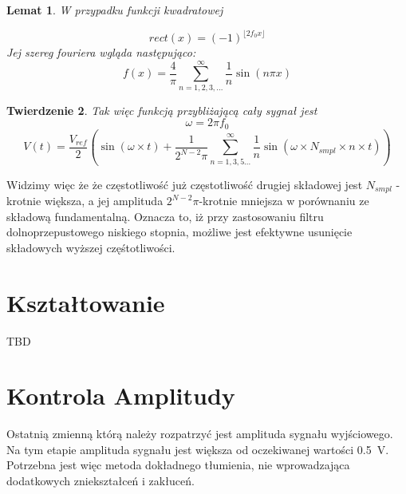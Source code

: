 \documentclass[12pt, a4paper]{article}
\newtheorem{theorem}{Twierdzenie}[section]
\newtheorem{lemma}[theorem]{Lemat}
\begin{document}
\begin{lemma}
	W przypadku funkcji kwadratowej
	
	\begin{equation}
		rect(x) = (-1)^{\lfloor	2 f_0 x \rfloor}
	\end{equation}
	Jej szereg fouriera wgląda następująco:
	\begin{equation}
			f(x) = \frac{4}{\pi} \sum_{n=1,2,3,...}^{\infty} \frac{1}{n} \sin \left( n \pi x \right)
	\end{equation}
\end{lemma}

\begin{theorem}
Tak więc funkcją przybliżającą cały sygnał jest
	\begin{equation}
		\omega = 2 \pi f_0 
	\end{equation}
	\begin{equation}
		V(t) = \frac{V_{ref}}{2} \left( \sin \left( \omega \times t \right) + \frac{1}{ 2^{N - 2}\pi} \sum_{n=1,3,5...}^{\infty} \frac{1}{n} \sin \left( \omega \times N_{smpl} \times n \times t \right) \right)
	\end{equation}
\end{theorem}


Widzimy więc że że częstotliwość już częstotliwość drugiej składowej jest $N_{smpl}$ - krotnie większa, a jej amplituda $2^{N -2}\pi$-krotnie mniejsza w porównaniu ze składową fundamentalną.
Oznacza to, iż przy zastosowaniu filtru dolnoprzepustowego niskiego stopnia, możliwe jest efektywne usunięcie składowych wyższej częśtotliwości.

\section{Kształtowanie}

\begin{LARGE}
	TBD
\end{LARGE}

\section{Kontrola Amplitudy}

Ostatnią zmienną którą należy rozpatrzyć jest amplituda sygnału wyjściowego. Na tym etapie amplituda sygnału jest większa od oczekiwanej wartości
\qty{0,5}{\V}. Potrzebna jest więc metoda dokładnego tłumienia, nie wprowadzająca dodatkowych zniekształceń i zakłuceń.
\end{document}
